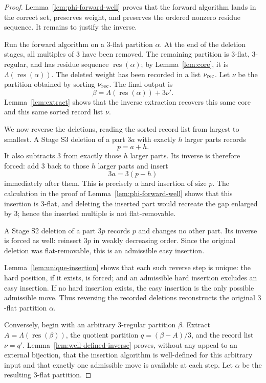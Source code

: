 \documentclass[11pt]{amsart}
\theoremstyle{definition}
\theoremstyle{remark}
\newcommand{\res}{\operatorname{res}}
\begin{document}
\begin{proof}
Lemma~\ref{lem:phi-forward-well} proves that the forward algorithm lands in the correct
set, preserves weight, and preserves the ordered nonzero residue sequence.  It
remains to justify the inverse.

Run the forward algorithm on a \(3\)-flat partition \(\alpha\).  At the end of
the deletion stages, all multiples of \(3\) have been removed.  The remaining
partition is \(3\)-flat, \(3\)-regular, and has residue sequence
\(\res(\alpha)\); by Lemma~\ref{lem:core}, it is \(\Lambda(\res(\alpha))\).
The deleted weight has been recorded in a list \(\nu_{\rm rec}\).  Let \(\nu\) be the partition obtained by sorting \(\nu_{\rm rec}\).  The final output is
\[
        \beta=\Lambda(\res(\alpha))+3\nu'.
\]
Lemma~\ref{lem:extract} shows that the inverse extraction recovers this same
core and this same sorted record list \(\nu\).

We now reverse the deletions, reading the sorted record list from largest to
smallest.  A Stage S3 deletion of a part \(3a\) with exactly \(h\) larger parts
records
\[
        p=a+h.
\]
It also subtracts \(3\) from exactly those \(h\) larger parts.  Its inverse is
therefore forced: add \(3\) back to those \(h\) larger parts and insert
\[
        3a=3(p-h)
\]
immediately after them.  This is precisely a hard insertion of size \(p\).  The
calculation in the proof of Lemma~\ref{lem:phi-forward-well} shows that this insertion
is \(3\)-flat, and deleting the inserted part would recreate the gap enlarged
by \(3\); hence the inserted multiple is not flat-removable.

A Stage S2 deletion of a part \(3p\) records \(p\) and changes no other part.
Its inverse is forced as well: reinsert \(3p\) in weakly decreasing order.  Since
the original deletion was flat-removable, this is an admissible easy insertion.

Lemma~\ref{lem:unique-insertion} shows that each such reverse step is unique:
the hard position, if it exists, is forced; and an admissible hard insertion
excludes an easy insertion.  If no hard insertion exists, the easy insertion is
the only possible admissible move.  Thus reversing the recorded deletions
reconstructs the original \(3\)-flat partition \(\alpha\).

Conversely, begin with an arbitrary \(3\)-regular partition \(\beta\).  Extract
\(A=\Lambda(\res(\beta))\), the quotient partition \(q=(\beta-A)/3\), and the record
list \(\nu=q'\).  Lemma~\ref{lem:well-defined-inverse} proves, without any
appeal to an external bijection, that the insertion algorithm is well-defined
for this arbitrary input and that exactly one admissible move is available at
each step.  Let \(\alpha\) be the resulting \(3\)-flat partition.


\end{proof}
\end{document}
